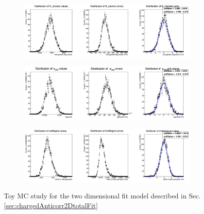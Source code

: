 \begin{figure}[H]
  \begin{subfigure}{14.5cm}
    \centering\includegraphics[width=13.8cm]{A3-Appendix/figs/2DanticorrLambdaC_N_Generic_mcstudy.png}
  \end{subfigure}
  \begin{subfigure}{14.5cm}
    \centering\includegraphics[width=13.8cm]{A3-Appendix/figs/2DanticorrLambdaC_sigmaCB1_mcstudy.png}
  \end{subfigure}
  \begin{subfigure}{14.5cm}
    \centering\includegraphics[width=13.8cm]{A3-Appendix/figs/2DanticorrLambdaC_InvMsigma_mcstudy.png}
  \end{subfigure}
  \caption{Toy MC study for the two dimensional fit model described in Sec.  \ref{sec:chargedAnticorr2DtotalFit}}
\end{figure}



